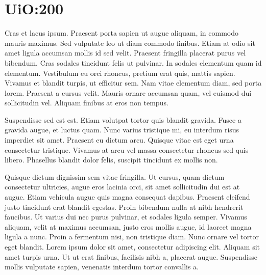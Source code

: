 \documentclass[../../main.tex]{subfiles}
\begin{document}
\chapter{UiO:200}

Cras et lacus ipsum. Praesent porta sapien ut augue aliquam, in commodo mauris maximus. Sed vulputate leo ut diam commodo finibus. Etiam at odio sit amet ligula accumsan mollis id sed velit. Praesent fringilla placerat purus vel bibendum. Cras sodales tincidunt felis ut pulvinar. In sodales elementum quam id elementum. Vestibulum eu orci rhoncus, pretium erat quis, mattis sapien. Vivamus et blandit turpis, ut efficitur sem. Nam vitae elementum diam, sed porta lorem. Praesent a cursus velit. Mauris ornare accumsan quam, vel euismod dui sollicitudin vel. Aliquam finibus at eros non tempus.

Suspendisse sed est est. Etiam volutpat tortor quis blandit gravida. Fusce a gravida augue, et luctus quam. Nunc varius tristique mi, eu interdum risus imperdiet sit amet. Praesent eu dictum arcu. Quisque vitae est eget urna consectetur tristique. Vivamus at arcu vel massa consectetur rhoncus sed quis libero. Phasellus blandit dolor felis, suscipit tincidunt ex mollis non.

Quisque dictum dignissim sem vitae fringilla. Ut cursus, quam dictum consectetur ultricies, augue eros lacinia orci, sit amet sollicitudin dui est at augue. Etiam vehicula augue quis magna consequat dapibus. Praesent eleifend justo tincidunt erat blandit egestas. Proin bibendum nulla at nibh hendrerit faucibus. Ut varius dui nec purus pulvinar, et sodales ligula semper. Vivamus aliquam, velit at maximus accumsan, justo eros mollis augue, id laoreet magna ligula a nunc. Proin a fermentum nisi, non tristique diam. Nunc ornare vel tortor eget blandit. Lorem ipsum dolor sit amet, consectetur adipiscing elit. Aliquam sit amet turpis urna. Ut ut erat finibus, facilisis nibh a, placerat augue. Suspendisse mollis vulputate sapien, venenatis interdum tortor convallis a.
\end{document}
